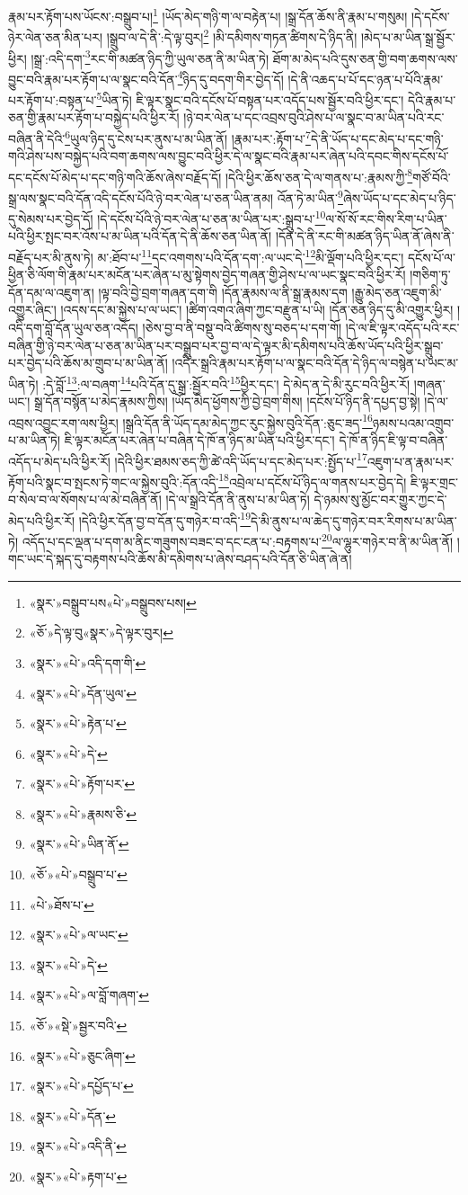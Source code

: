རྣམ་པར་རྟོག་པས་ཡོངས་:བསྒྲུབ་པ།\footnote{«སྣར་»བསྒྲུབ་པས«པེ་»བསྒྲུབས་པས།} །ཡོད་མེད་གཉི་ག་ལ་བརྟེན་པ། །སྒྲ་དོན་ཆོས་ནི་རྣམ་པ་གསུམ། །དེ་དངོས་ཉེར་ལེན་ཅན་མིན་པར། །སྒྲུབ་ལ་དེ་ནི་:དེ་ལྟ་བུར།\footnote{«ཅོ་»དེ་ལྟ་བུ«སྣར་»དེ་ལྟར་བུར།} །མི་དམིགས་གཏན་ཚིགས་དེ་ཉིད་ནི། །མེད་པ་མ་ཡིན་སྒྲ་སྦྱོར་ཕྱིར། །སྒྲ་:འདི་དག་\footnote{«སྣར་»«པེ་»འདི་དག་གི་}རང་གི་མཚན་ཉིད་ཀྱི་ཡུལ་ཅན་ནི་མ་ཡིན་ཏེ། ཐོག་མ་མེད་པའི་དུས་ཅན་གྱི་བག་ཆགས་ལས་བྱུང་བའི་རྣམ་པར་རྟོག་པ་ལ་སྣང་བའི་དོན་\footnote{«སྣར་»«པེ་»དོན་ཡུལ་}ཉིད་དུ་བདག་གིར་བྱེད་དོ། །དེ་ནི་འཆད་པ་པོ་དང་ཉན་པ་པོའི་རྣམ་པར་རྟོག་པ་:བསྟན་པ་\footnote{«སྣར་»«པེ་»རྟེན་པ་}ཡིན་ཏེ། ཇི་ལྟར་སྣང་བའི་དངོས་པོ་བསྟན་པར་འདོད་པས་སྦྱོར་བའི་ཕྱིར་དང་། དེའི་རྣམ་པ་ཅན་གྱི་རྣམ་པར་རྟོག་པ་བསྐྱེད་པའི་ཕྱིར་རོ། །ཉེ་བར་ལེན་པ་དང་འབྲས་བུའི་ཤེས་པ་ལ་སྣང་བ་མ་ཡིན་པའི་རང་བཞིན་ནི་དེའི་\footnote{«སྣར་»«པེ་»དེ་}ཡུལ་ཉིད་དུ་ངེས་པར་ནུས་པ་མ་ཡིན་ནོ། །རྣམ་པར་:རྟོག་པ་\footnote{«སྣར་»«པེ་»རྟོག་པར་}དེ་ནི་ཡོད་པ་དང་མེད་པ་དང་གཉི་གའི་ཤེས་པས་བསྐྱེད་པའི་བག་ཆགས་ལས་བྱུང་བའི་ཕྱིར་དེ་ལ་སྣང་བའི་རྣམ་པར་ཞེན་པའི་དབང་གིས་དངོས་པོ་དང་དངོས་པོ་མེད་པ་དང་གཉི་གའི་ཆོས་ཞེས་བརྗོད་དོ། །དེའི་ཕྱིར་ཆོས་ཅན་དེ་ལ་གནས་པ་:རྣམས་ཀྱི་\footnote{«སྣར་»«པེ་»རྣམས་ཅི་}གཙོ་བོའི་སྒྲ་ལས་སྣང་བའི་དོན་འདི་དངོས་པོའི་ཉེ་བར་ལེན་པ་ཅན་ཡིན་ནམ། འོན་ཏེ་མ་ཡིན་\footnote{«སྣར་»«པེ་»ཡིན་ནོ་}ཞེས་ཡོད་པ་དང་མེད་པ་ཉིད་དུ་སེམས་པར་བྱེད་དོ། །དེ་དངོས་པོའི་ཉེ་བར་ལེན་པ་ཅན་མ་ཡིན་པར་:སྒྲུབ་པ་\footnote{«ཅོ་»«པེ་»བསྒྲུབ་པ་}ལ་སོ་སོ་རང་གིས་རིག་པ་ཡིན་པའི་ཕྱིར་སྤང་བར་འོས་པ་མ་ཡིན་པའི་དོན་དེ་ནི་ཆོས་ཅན་ཡིན་ནོ། །དོན་དེ་ནི་རང་གི་མཚན་ཉིད་ཡིན་ནོ་ཞེས་ནི་བརྗོད་པར་མི་ནུས་ཏེ། མ་:ཐོབ་པ་\footnote{«པེ་»ཐོས་པ་}དང་འགགས་པའི་དོན་དག་:ལ་ཡང་དེ་\footnote{«སྣར་»«པེ་»ལ་ཡང་}མི་ལྡོག་པའི་ཕྱིར་དང་། དངོས་པོ་ལ་ཕྱིན་ཅི་ལོག་གི་རྣམ་པར་མངོན་པར་ཞེན་པ་མུ་སྟེགས་བྱེད་གཞན་གྱི་ཤེས་པ་ལ་ཡང་སྣང་བའི་ཕྱིར་རོ། །གཅིག་ཏུ་དོན་དམ་ལ་འཇུག་ན། །ལྟ་བའི་བྱེ་བྲག་གཞན་དག་གི །དོན་རྣམས་ལ་ནི་སྒྲ་རྣམས་དག །རྒྱུ་མེད་ཅན་འཇུག་མི་འགྱུར་ཞིང་། །འདས་དང་མ་སྐྱེས་པ་ལ་ཡང་། །ཚིག་འགའ་ཞིག་ཀྱང་བརྫུན་པ་ཡི། །དོན་ཅན་ཉིད་དུ་མི་འགྱུར་ཕྱིར། །འདི་དག་བློ་དོན་ཡུལ་ཅན་འདོད། །ཅེས་བྱ་བ་ནི་བསྡུ་བའི་ཚིགས་སུ་བཅད་པ་དག་གོ། །དེ་ལ་ཇི་ལྟར་འདོད་པའི་རང་བཞིན་གྱི་ཉེ་བར་ལེན་པ་ཅན་མ་ཡིན་པར་བསྒྲུབ་པར་བྱ་བ་ལ་དེ་ལྟར་མི་དམིགས་པའི་ཆོས་ཡོད་པའི་ཕྱིར་སྒྲུབ་པར་བྱེད་པའི་ཆོས་མ་གྲུབ་པ་མ་ཡིན་ནོ། །འདིར་སྒྲའི་རྣམ་པར་རྟོག་པ་ལ་སྣང་བའི་དོན་དེ་ཉིད་ལ་བསྙེན་པ་ཡང་མ་ཡིན་ཏེ། :དེ་བློ་\footnote{«སྣར་»«པེ་»དེ་}:ལ་བཞག་\footnote{«སྣར་»«པེ་»ལ་བློ་གཞག་}པའི་དོན་དུ་སྒྲ་:སྦྱོར་བའི་\footnote{«ཅོ་»«སྡེ་»སྦྱར་བའི་}ཕྱིར་དང་། དེ་མེད་ན་དེ་མི་རུང་བའི་ཕྱིར་རོ། །གཞན་ཡང་། སྒྲ་དོན་བསྙོན་པ་མེད་རྣམས་ཀྱིས། །ཡོད་མེད་ཕྱོགས་ཀྱི་བྱེ་བྲག་གིས། །དངོས་པོ་ཉིད་ནི་དཔྱད་བྱ་སྟེ། །དེ་ལ་འབྲས་འབྱུང་རག་ལས་ཕྱིར། །སྒྲའི་དོན་ནི་ཡོད་དམ་མེད་ཀྱང་རུང་སྐྱེས་བུའི་དོན་:ཅུང་ཟད་\footnote{«སྣར་»«པེ་»ཅུང་ཞིག་}ཉམས་པའམ་འགྲུབ་པ་མ་ཡིན་ཏེ། ཇི་ལྟར་མངོན་པར་ཞེན་པ་བཞིན་དེ་ཁོ་ན་ཉིད་མ་ཡིན་པའི་ཕྱིར་དང་། དེ་ཁོ་ན་ཉིད་ཇི་ལྟ་བ་བཞིན་འདོད་པ་མེད་པའི་ཕྱིར་རོ། །དེའི་ཕྱིར་ཐམས་ཅད་ཀྱི་ཚེ་འདི་ཡོད་པ་དང་མེད་པར་:སྤྱོད་པ་\footnote{«སྣར་»«པེ་»དཔྱོད་པ་}འཇུག་པ་ན་རྣམ་པར་རྟོག་པའི་སྣང་བ་སྤངས་ཏེ་གང་ལ་སྐྱེས་བུའི་:དོན་འདི་\footnote{«སྣར་»«པེ་»དོན་}འབྲེལ་པ་དངོས་པོ་ཉིད་ལ་གནས་པར་བྱེད་དེ། ཇི་ལྟར་གྲང་བ་སེལ་བ་ལ་སོགས་པ་ལ་མེ་བཞིན་ནོ། །དེ་ལ་སྒྲའི་དོན་ནི་ནུས་པ་མ་ཡིན་ཏེ། དེ་ཉམས་སུ་མྱོང་བར་གྱུར་ཀྱང་དེ་མེད་པའི་ཕྱིར་རོ། །དེའི་ཕྱིར་དོན་བྱ་བ་དོན་དུ་གཉེར་བ་འདི་\footnote{«སྣར་»«པེ་»འདི་ནི་}དེ་མི་ནུས་པ་ལ་ཆེད་དུ་གཉེར་བར་རིགས་པ་མ་ཡིན་ཏེ། འདོད་པ་དང་ལྡན་པ་དག་མ་ནིང་གཟུགས་བཟང་བ་དང་ངན་པ་:བརྟགས་པ་\footnote{«སྣར་»«པེ་»རྟག་པ་}ལ་ལྷུར་གཉེར་བ་ནི་མ་ཡིན་ནོ། །གང་ཡང་དེ་སྐད་དུ་བརྟགས་པའི་ཆོས་མི་དམིགས་པ་ཞེས་བཤད་པའི་དོན་ཅི་ཡིན་ཞེ་ན། 